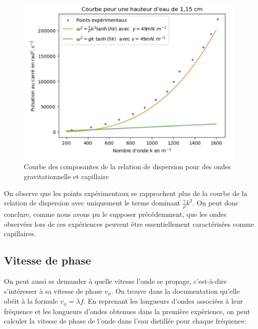 \documentclass{report}
\begin{document}
\begin{figure}[H]
    \centering
    \includegraphics[scale=0.8]{graphe6.jpeg}
    \caption{Courbe des composantes de la relation de dispersion pour des ondes gravitationnelle et capillaire}
    \label{fig:enter-label}
\end{figure}



On observe que les points expérimentaux se rapprochent plus de la courbe de la relation de dispersion avec uniquement le terme dominant $\frac{\gamma}{\rho}k^3$. On peut donc conclure, comme nous avons pu le supposer précédemment, que les ondes observées lors de ces expériences peuvent être essentiellement caractérisées comme capillaires. 



\subsection{Vitesse de phase}
On peut aussi se demander à quelle vitesse l’onde se propage, c’est-à-dire s’intéresser à sa vitesse de phase $v_{\phi}$. On trouve dans la documentation qu’elle obéit à la formule  $v_{\phi} = \lambda f$. En reprenant les longueurs d’ondes associées à leur fréquence et les longueurs d'ondes obtenues dans la première expérience, on peut calculer la vitesse de phase de l’onde dans l’eau distillée pour chaque fréquence:
\end{document}
